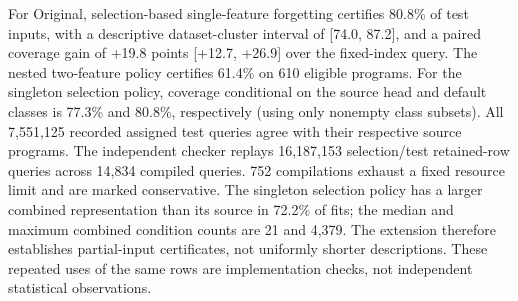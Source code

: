 For Original, selection-based single-feature forgetting certifies 80.8\% of test inputs, with a descriptive dataset-cluster interval of [74.0, 87.2], and a paired coverage gain of +19.8 points [+12.7, +26.9] over the fixed-index query. The nested two-feature policy certifies 61.4\% on 610 eligible programs. For the singleton selection policy, coverage conditional on the source head and default classes is 77.3\% and 80.8\%, respectively (using only nonempty class subsets). All 7,551,125 recorded assigned test queries agree with their respective source programs. The independent checker replays 16,187,153 selection/test retained-row queries across 14,834 compiled queries. 752 compilations exhaust a fixed resource limit and are marked conservative. The singleton selection policy has a larger combined representation than its source in 72.2\% of fits; the median and maximum combined condition counts are 21 and 4,379. The extension therefore establishes partial-input certificates, not uniformly shorter descriptions. These repeated uses of the same rows are implementation checks, not independent statistical observations.
